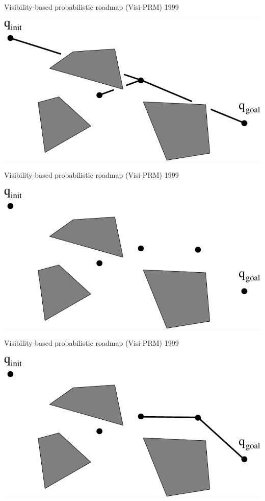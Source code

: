 \begin{frame} {Visibility-based probabilistic roadmap (Visi-PRM) 1999}
\centerline {
  \includegraphics[width=.8\linewidth]{figures/VPRM9.pdf}
}
\end{frame}

\begin{frame} {Visibility-based probabilistic roadmap (Visi-PRM) 1999}
\centerline {
  \includegraphics[width=.8\linewidth]{figures/VPRM10.pdf}
}
\end{frame}

\begin{frame} {Visibility-based probabilistic roadmap (Visi-PRM) 1999}
\centerline {
  \includegraphics[width=.8\linewidth]{figures/VPRM11.pdf}
}
\end{frame}

